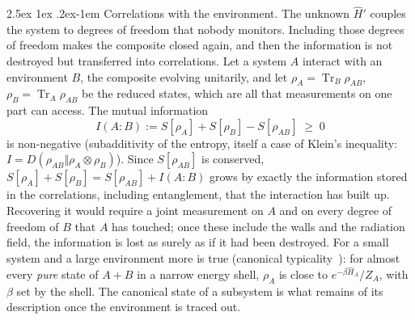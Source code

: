\documentclass[10pt,a4paper]{article}
\makeatletter
\renewcommand{\paragraph}{\@startsection{paragraph}{4}{\z@}%
  {2.5ex \@plus 1ex \@minus .2ex}{-1em}%
  {\normalfont\fontsize{14pt}{17pt}\selectfont\bfseries}}
\newcommand{\Tr}{\operatorname{Tr}}
\makeatother
\begin{document}
\paragraph{Correlations with the environment.}
The unknown $ \hat H' $ couples the system to degrees of freedom that nobody monitors.
Including those degrees of freedom makes the composite closed again, and then the information is not destroyed but transferred into correlations.
Let a system $ A $ interact with an environment $ B $, the composite evolving unitarily, and let $ \rho_A = \Tr_B\rho_{AB} $, $ \rho_B = \Tr_A\rho_{AB} $ be the reduced states, which are all that measurements on one part can access.
The mutual information
\[
  I(A{:}B) := S[\rho_A] + S[\rho_B] - S[\rho_{AB}] \;\geq\; 0
\]
is non-negative (subadditivity of the entropy, itself a case of Klein's inequality: $ I = D(\rho_{AB} \Vert \rho_A\otimes\rho_B) $).
Since $ S[\rho_{AB}] $ is conserved, $ S[\rho_A] + S[\rho_B] = S[\rho_{AB}] + I(A{:}B) $ grows by exactly the information stored in the correlations, including entanglement, that the interaction has built up.
Recovering it would require a joint measurement on $ A $ and on every degree of freedom of $ B $ that $ A $ has touched; once these include the walls and the radiation field, the information is lost as surely as if it had been destroyed.
For a small system and a large environment more is true (canonical typicality~\cite{Goldstein2006,Popescu2006}): for almost every \emph{pure} state of $ A + B $ in a narrow energy shell, $ \rho_A $ is close to $ e^{-\beta\hat H_A}/Z_A $, with $ \beta $ set by the shell.
The canonical state of a subsystem is what remains of its description once the environment is traced out.
\end{document}
